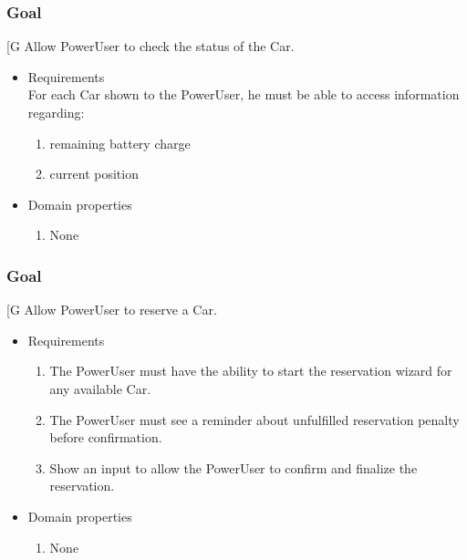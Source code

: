     \subsubsection{Goal }
    {[}G\arabic{goalctr}{]}
    Allow PowerUser to check the status of the Car.
    \begin{itemize}
        \item Requirements
        \\For each Car shown to the PowerUser, he must be able to access information regarding:
        \begin{enumerate}[REQ]
    		\item remaining battery charge
			\item current position
        \end{enumerate}
        \item Domain properties
        \begin{enumerate}[PRO]
    			\item None
        \end{enumerate}
    \end{itemize}

    \subsubsection{Goal }
    {[}G\arabic{goalctr}{]}
    Allow PowerUser to reserve a Car.
    \begin{itemize}
        \item Requirements
        \begin{enumerate}[REQ]
    		\item The PowerUser must have the ability to start the reservation wizard for any available Car.
			\item The PowerUser must see a reminder about unfulfilled reservation penalty before confirmation.
			\item Show an input to allow the PowerUser to confirm and finalize the reservation.
        \end{enumerate}
        \item Domain properties
        \begin{enumerate}[PRO]
    			\item None
        \end{enumerate}
    \end{itemize}


